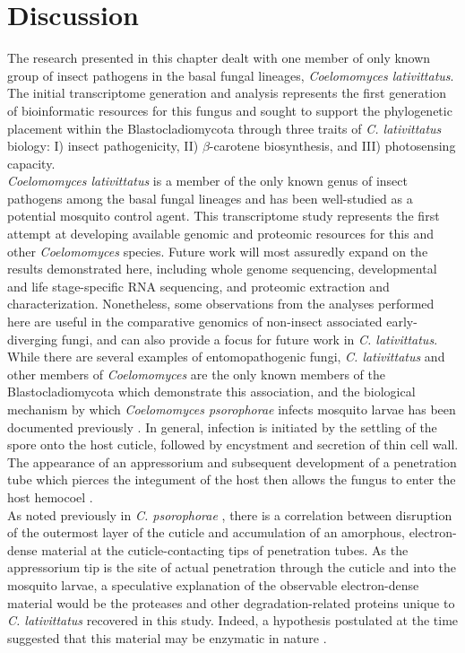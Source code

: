\section{Discussion}
The research presented in this chapter dealt with one member of only known group of insect pathogens in the basal fungal lineages, \textit{Coelomomyces lativittatus}. The initial transcriptome generation and analysis represents the first generation of bioinformatic resources for this fungus and sought to support the phylogenetic placement within the Blastocladiomycota through three traits of \textit{C. lativittatus} biology: I) insect pathogenicity, II) $\beta$-carotene biosynthesis, and III) photosensing capacity.\\
\textit{Coelomomyces lativittatus} is a member of the only known genus of insect pathogens among the basal fungal lineages and has been well-studied as a potential mosquito control agent. This transcriptome study represents the first attempt at developing available genomic and proteomic resources for this and other \textit{Coelomomyces} species. Future work will most assuredly expand on the results demonstrated here, including whole genome sequencing, developmental and life stage-specific RNA sequencing, and proteomic extraction and characterization. Nonetheless, some observations from the analyses performed here are useful in the comparative genomics of non-insect associated early-diverging fungi, and can also provide a focus for future work in \textit{C. lativittatus}. \\
\indent While there are several examples of entomopathogenic fungi, \textit{C. lativittatus} and other members of \textit{Coelomomyces} are the only known members of the Blastocladiomycota which demonstrate this association, and the biological mechanism by which \textit{Coelomomyces psorophorae} infects mosquito larvae has been documented previously \cite{Travland1979,Zebold1979}. In general, infection is initiated by the settling of the spore onto the host cuticle, followed by encystment and secretion of thin cell wall. The appearance of an appressorium and subsequent development of a penetration tube which pierces the integument of the host then allows the fungus to enter the host hemocoel \cite{Zebold1979}. \\
\indent As noted previously in \textit{C. psorophorae} \cite{Travland1979}, there is a correlation between disruption of the outermost layer of the cuticle and accumulation of an amorphous, electron-dense material at the cuticle-contacting tips of penetration tubes. As the appressorium tip is the site of actual penetration through the cuticle and into the mosquito larvae, a speculative explanation of the observable electron-dense material would be the proteases and other degradation-related proteins unique to \textit{C. lativittatus} recovered in this study. Indeed, a hypothesis postulated at the time suggested that this material may be enzymatic in nature \cite{Travland1979}. \\
